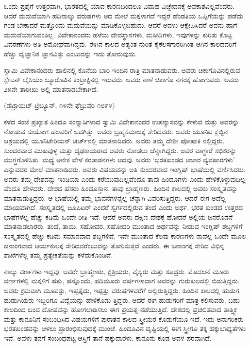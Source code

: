 ಒಂದು ಪ್ರಶ್ನೆಗೆ ಉತ್ತರವಾಗಿ, ಭಾರತದಲ್ಲಿ ಯಾವ ಕಾರಣದಿಂದಲೂ ವಿವಾಹ ವಿಚ್ಛೇದನಕ್ಕೆ ಅವಕಾಶವಿಲ್ಲವೆಂದರು. ಆದರೆ ಮದುವೆಯಾಗಿ ಹದಿನಾಲ್ಕು ವರುಷಗಳು ಆದ ಮೇಲೆ ಮಕ್ಕಳಾಗದೆ ಇದ್ದರೆ ಹೆಂಡತಿಯ ಒಪ್ಪಿಗೆಯನ್ನು ಪಡೆದು ಗಂಡ ಬೇಕಾದರೆ ಮತ್ತೊಂದು ಮದುವೆಯನ್ನು ಮಾಡಿಕೊಳ್ಳಬಹುದು. ಆದರೆ ಅವಳು ಆಕ್ಷೇಪಿಸಿದರೆ ಅವನು ಹಾಗೆ ಮದುವೆಯಾಗುವಂತಿಲ್ಲ. ವಿವೇಕಾನಂದರು ಹಳೆಯ ದೇವಸ್ಥಾನಗಳು, ಮಸೀದಿಗಳು, ಇವುಗಳನ್ನು ಕುರಿತು ಕೊಟ್ಟ ವಿವರಣೆಗಳು ಅತಿ ಅಮೋಘವಾಗಿದ್ದವು. ಈಗಿನ ಕಾಲದ ಅತ್ಯಂತ ನುರಿತ ಕೈಕೆಲಸಗಾರರಿಗಿಂತ ಆಗಿನ ಕಾಲದವರಿಗೆ ಹೆಚ್ಚು ವೈಜ್ಞಾನಿಕ ಜ್ಞಾನವಿತ್ತು ಎಂಬುದನ್ನು ಇದು ತೋರುವುದು.

ಸ್ವಾಮಿ ವಿವೇಕಾನಂದರು  ಹಾಲಿನಲ್ಲಿ ಕೊನೆಯ ಬಾರಿ ಇಂದಿನ ರಾತ್ರಿ ಮಾತನಾಡುವರು. ಅವರು ಚಿಕಾಗೊವಿನಲ್ಲಿರುವ ಸ್ಲೇಟನ್​ ಲೈಸಿಯಂ ಬ್ಯೂರೊವಿನ ಕಂಟ್ರಾಕ್ಟಿನಲ್ಲಿ ಇರುವರು. ಅವರು ನಾಳೆ ಚಿಕಾಗೊ ನಗರಕ್ಕೆ ಹೋಗುವರು. ಅವರು ೨೫ನೇ ತಾರೀಖು ಅಲ್ಲಿ ಮಾತನಾಡಬೇಕಾಗಿದೆ.

\delimiter

\begin{center}
(ಡೆಟ್ರಾಯಿಟ್​ ಟ್ರಿಬ್ಯೂನ್​, ೧೪ನೇ ಫೆಬ್ರುವರಿ ೧೮೯೪)
\end{center}

ಕಳೆದ ಸಂಜೆ ಪ್ರಖ್ಯಾತ ಹಿಂದೂ ಸಂನ್ಯಾಸಿಗಳಾದ ಸ್ವಾಮಿ ವಿವೇಕಾನಂದರ ಉಪನ್ಯಾಸವನ್ನು ಕೇಳುವ ಮತ್ತು ಅವರನ್ನು ನೋಡುವ ಸುಯೋಗ ಹಲವರಿಗೆ ಒದಗಿತ್ತು. ಅವರು ಬ್ರಹ್ಮಸಮಾಜಕ್ಕೆ ಸೇರಿದವರು. ಅವರು ಯೂನಿಟಿ ಕ್ಲಬ್ಬಿನ ಆಶ್ರಯದಲ್ಲಿ ಯೂನಿಟೇರಿಯನ್​ ಚರ್ಚ್​ನಲ್ಲಿ ಮಾತನಾಡಿದರು. ಅವರು ತಮ್ಮ ದೇಶೀ ಪೋಷಾಕಿ ನಲ್ಲಿದ್ದರು. ಸುಂದರವಾದ ಮುಖವುಳ್ಳ ಮತ್ತು ದೃಢಕಾಯರಾದ ಅವರು ನೋಡಲು ಚೆನ್ನಾಗಿದ್ದರು. ಅವರ ವಾಗ್ಧಾರೆ ಸಭಿಕರನ್ನು ಮುಗ್ಧಗೊಳಿಸಿತು. ಮಧ್ಯೆ ಅನೇಕ ವೇಳೆ ಕರತಾಡನಗಳು ಆದವು. ಅವರು ‘ಭರತಖಂಡದ ಆಚಾರ ವ್ಯವಹಾರಗಳು’ ಎನ್ನುವದರ ಮೇಲೆ ಮಾತನಾಡಿದರು. ಅವರು ವಿಷಯವನ್ನು ಅತಿ ಸುಂದರವಾದ ಇಂಗ್ಲಿಷ್​ ಭಾಷೆಯಲ್ಲಿ ವರ್ಣಿಸಿದರು. ಅವರು ತಮ್ಮ ದೇಶವನ್ನು ಇಂಡಿಯಾ ಎಂದು ಕರೆಯುವುದಿಲ್ಲವೆಂದೂ ತಾವು ಹಿಂದೂಗಳು ಎಂದು ಹೇಳಿಕೊಳ್ಳುವುದಿಲ್ಲ ವೆಂದೂ ಹೇಳಿದರು. ದೇಶದ ಹೆಸರು ಹಿಂದೂಸ್ತಾನ, ತಾವು ಬ್ರಾಹ್ಮಣರು. ಹಿಂದಿನ ಕಾಲದಲ್ಲಿ ಅವರು ಸಂಸ್ಕೃತವನ್ನು ಮಾತನಾಡುತ್ತಿದ್ದರು. ಆ ಭಾಷೆಯಲ್ಲಿ ತಮ್ಮ ಭಾವನೆಗಳನ್ನೆಲ್ಲ ಚೆನ್ನಾಗಿ ವಿವರಿಸುತ್ತಿದ್ದರು. ಆದರೆ ಈಗ ಅದೆಲ್ಲ ಮಾಯವಾಗಿದೆ. ಸಂಸ್ಕೃತದಲ್ಲಿ ಜೂಪಿಟರ್​ ಎಂದರೆ ಸ್ವರ್ಗದಲ್ಲಿರುವ ತಂದೆ ಎಂದು ಅರ್ಥ. ಭರತ ಖಂಡದ ಉತ್ತರದ ಭಾಷೆಗಳೆಲ್ಲ ಹೆಚ್ಚು ಕಡಿಮೆ ಒಂದೇ ರೀತಿ ಇದೆ. ಆದರೆ ಅವರು ದಕ್ಷಿಣ ದೇಶಕ್ಕೆ ಹೋದರೆ ಅಲ್ಲಿಯ ಜನರೊಡನೆ ಮಾತನಾಡಲಾರರು. ತಂದೆ, ತಾಯಿ, ಸಹೋದರ, ಸಹೋದರಿ ಮುಂತಾದ ಅರ್ಥವನ್ನು ನೀಡುವ ಇಂಗ್ಲಿಷ್​ ಶಬ್ದಗಳಿಗೆ ಸಂಸ್ಕೃತದಲ್ಲಿ ಹೆಚ್ಚು ಕಡಿಮೆ ಸಮಾನವಾದ ಶಬ್ದಗಳಿವೆ. ಇವೇ ಮುಂತಾದ ಕೆಲವು ಕಾರಣಗಳು ನಾವೆಲ್ಲ ಒಂದೇ ಮೂಲ ಜನಾಂಗವಾದ ಆರ್ಯಕುಲಕ್ಕೆ ಸೇರಿದವರೆಂಬುದನ್ನು ತೋರಿಸುತ್ತದೆ ಎಂದರು. ಈ ಜನಾಂಗಕ್ಕೆ ಸೇರಿದ ವಿಭಿನ್ನ ಶಾಖೆಗಳೆಲ್ಲ ತಮ್ಮ ಪ್ರತ್ಯೇಕತೆಯನ್ನು ಕಳೆದುಕೊಂಡಿವೆ.

ನಾಲ್ಕು ವರ್ಣಗಳು ಇದ್ದವು. ಅವರೇ ಬ್ರಾಹ್ಮಣರು, ಕ್ಷತ್ರಿಯರು, ವೈಶ್ಯರು ಮತ್ತು ಶೂದ್ರರು. ಮೊದಲನೆ ಮೂರು ವರ್ಣಗಳಲ್ಲಿ ಮಕ್ಕಳಿಗೆ ಹತ್ತು, ಹನ್ನೊಂದು, ಹದಿಮೂರು ವರ್ಷಗಳಾದಾಗ ಅವರನ್ನು ಗುರುಕುಲದಲ್ಲಿ ಬಿಡುತ್ತಿದ್ದರು. ಅವರು ಕ್ರಮವಾಗಿ ಮೂವತ್ತು, ಇಪ್ಪತ್ತೈದು, ಇಪ್ಪತ್ತು ವರುಷಗಳವರೆಗೆ ಅಲ್ಲಿರುತ್ತಿದ್ದರು. ಹಿಂದಿನ ಕಾಲದಲ್ಲಿ ಹುಡುಗ ಹುಡುಗಿಯರು ಇಬ್ಬರಿಗೂ ವಿದ್ಯೆಯನ್ನು ಹೇಳಿಕೊಡು ತ್ತಿದ್ದರು. ಆದರೆ ಈಗ ಹುಡುಗರಿಗೆ ಮಾತ್ರ ಕಲಿಸುವರು. ಬಹು ಕಾಲದಿಂದ ಬಂದ ದೋಷವನ್ನು ಹೋಗಲಾಡಿಸಲು ಈಗ ಪ್ರಯತ್ನ ನಡೆಯುತ್ತಿದೆ. ದೇಶದಲ್ಲಿ ಪ್ರಚಲಿತವಾದ ತಾತ್ತ್ವಿಕ ಮತ್ತು ಕಾನೂನಿಗೆ ಸಂಬಂಧಿಸಿದ ವಿಷಯಗಳಿಗೆ ಪುರಾತನ ಕಾಲದ ಸ್ತ್ರೀಯರ ಕೊಡುಗೆಯೂ ಇದೆ. ಇದು ಅನಾಗರಿಕರು ಭರತಖಂಡವನ್ನು ಆಳಲು ಪ್ರಾರಂಭಿಸುವುದಕ್ಕೆ ಮುಂಚೆ. ಹಿಂದೂವಿನ ದೃಷ್ಟಿಯಲ್ಲಿ ಈಗ ಸ್ತ್ರೀಗೂ ತಕ್ಕ ಹಕ್ಕುಬಾಧ್ಯತೆಗಳು ಇವೆ. ಅವಳು ತನಗೆ ಸಂಬಂಧಪಟ್ಟ ಆಸ್ತಿಗೆ ತಾನೆ ಹಕ್ಕುದಾರಳು, ಕಾನೂನು ಕೂಡ ಅವಳ ಪರವಾಗಿದೆ.

